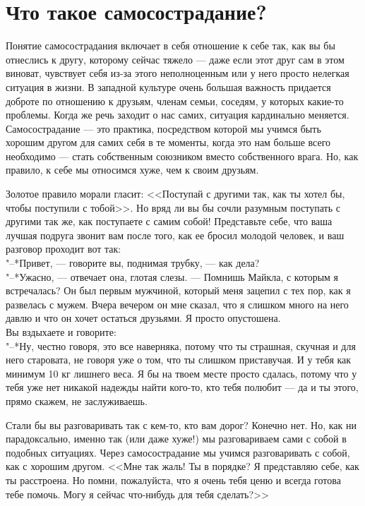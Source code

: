 
\section{Что такое самосострадание?}

Понятие самосострадания включает в себя отношение к себе так, как вы бы отнеслись к другу, которому сейчас тяжело --- даже если этот друг сам в этом виноват,  чувствует себя из-за этого неполноценным или у него просто нелегкая ситуация в жизни. В западной культуре очень большая важность придается доброте по отношению к друзьям, членам семьи, соседям, у которых какие-то проблемы. Когда же речь заходит о нас самих, ситуация кардинально меняется. Самосострадание --- это практика, посредством которой мы учимся быть хорошим другом для самих себя в те моменты, когда это нам больше всего необходимо --- стать собственным союзником вместо собственного врага. Но, как правило, к себе мы относимся хуже, чем к своим друзьям.

Золотое правило морали гласит: <<Поступай с другими так, как ты хотел бы, чтобы поступили с тобой>>. Но вряд ли вы бы сочли разумным поступать с другими так же, как поступаете с самим собой! Представьте себе, что ваша лучшая подруга звонит вам после того, как ее бросил молодой человек, и ваш разговор проходит вот так:\\
"--*Привет, --- говорите вы, поднимая трубку, --- как дела?\\
"--*Ужасно, --- отвечает она, глотая слезы. --- Помнишь Майкла, с которым я встречалась? Он был первым мужчиной, который меня зацепил с тех пор, как я развелась с мужем. Вчера вечером он мне сказал, что я слишком много на него давлю и что он хочет остаться друзьями. Я просто опустошена.\\
Вы вздыхаете и говорите:\\
"--*Ну, честно говоря, это все наверняка, потому что ты страшная, скучная и для него старовата, не говоря уже о том, что ты слишком приставучая. И у тебя как минимум 10 кг лишнего веса. Я бы на твоем месте просто сдалась, потому что у тебя уже нет никакой надежды найти кого-то, кто тебя полюбит --- да и ты этого, прямо скажем, не заслуживаешь.

Стали бы вы разговаривать так с кем-то, кто вам дорог? Конечно нет. Но, как ни парадоксально, именно так (или даже хуже!) мы разговариваем сами с собой в подобных ситуациях. Через самосострадание мы учимся разговаривать с собой, как с хорошим другом. <<Мне так жаль! Ты в порядке? Я представляю себе, как ты расстроена. Но помни, пожалуйста, что я очень тебя ценю и всегда готова тебе помочь. Могу я сейчас что-нибудь для тебя сделать?>>

